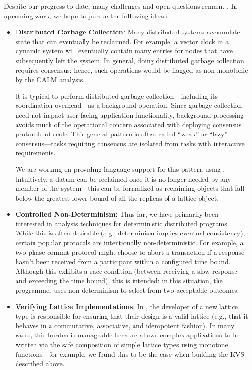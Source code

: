 Despite our progress to date, many challenges and open questions remain.  .  In upcoming work, we hope to pursue the following ideas:
\begin{itemize}
\item \textbf{Distributed Garbage Collection:} Many distributed systems
  accumulate state that can eventually be reclaimed. For example, a vector clock
  in a dynamic system will eventually contain many entries for nodes that have
  subsequently left the system. In general, doing distributed garbage collection
  requires consensus; hence, such operations would be flagged as non-monotonic
  by the CALM analysis.

  It is typical to perform distributed garbage collection---including its
  coordination overhead---as a background operation. Since garbage collection
  need not impact user-facing application functionality, background processing
  avoids much of the operational concern associated with deploying consensus
  protocols at scale. This general pattern is often called ``weak'' or ``lazy''
  consensus---tasks requiring consensus are isolated from tasks with interactive
  requirements.

  We are working on providing language support for this pattern using
  \blooml. Intuitively, a datum can be reclaimed once it is no longer needed by
  any member of the system---this can be formalized as reclaiming objects that
  fall below the greatest lower bound of all the replicas of a lattice object.  

\item \textbf{Controlled Non-Determinism:} Thus far, we have primarily been
  interested in analysis techniques for deterministic distributed
  programs. While this is often desirable (e.g., determinism implies eventual
  consistency), certain popular protocols are intentionally
  non-deterministic. For example, a two-phase commit protocol might choose to
  abort a transaction if a response hasn't been received from a participant
  within a configured time bound. Although this exhibits a race condition
  (between receiving a slow response and exceeding the time bound), this is
  intended: in this situation, the programmer uses non-determinism to select
  from two acceptable outcomes.  

\item \textbf{Verifying Lattice Implementations:} In \blooml, the developer of a
  new lattice type is responsible for ensuring that their design is a valid
  lattice (e.g., that it behaves in a commutative, associative, and idempotent
  fashion). In many cases, this burden is manageable because \blooml allows
  complex applications to be written via the safe composition of simple lattice
  types using monotone functions---for example, we found this to be the case
  when building the KVS described above.


\end{itemize}
